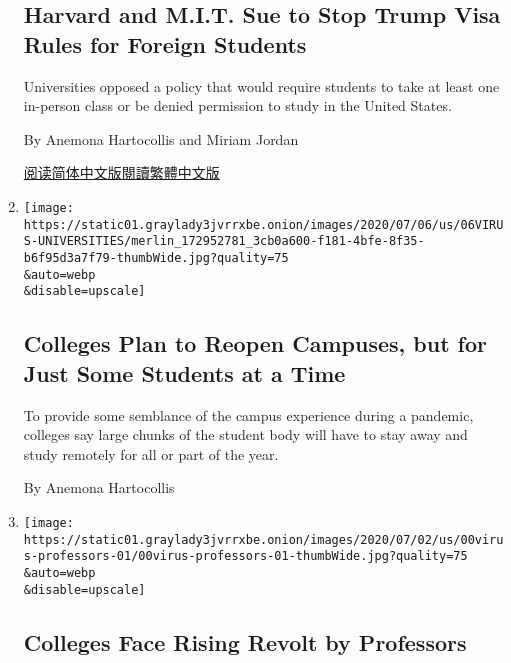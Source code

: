 \begin{enumerate}
{  \subsection{Harvard and M.I.T. Sue to Stop Trump Visa Rules for
  Foreign
  Students}\label{harvard-and-mit-sue-to-stop-trump-visa-rules-for-foreign-students}}

  Universities opposed a policy that would require students to take at
  least one in-person class or be denied permission to study in the
  United States.

  By Anemona Hartocollis and Miriam Jordan

  \href{https://cn.nytimes3xbfgragh.onion/usa/20200709/harvard-mit-trump-ice-students/}{阅读简体中文版}\href{https://cn.nytimes3xbfgragh.onion/usa/20200709/harvard-mit-trump-ice-students/zh-hant/}{閱讀繁體中文版}
\item
  \href{/2020/07/06/us/coronavirus-universities-colleges-reopening.html}{}

  \texttt{[image: https://static01.graylady3jvrrxbe.onion/images/2020/07/06/us/06VIRUS-UNIVERSITIES/merlin\_172952781\_3cb0a600-f181-4bfe-8f35-b6f95d3a7f79-thumbWide.jpg?quality=75\\\&auto=webp\\\&disable=upscale]}

  \hypertarget{colleges-plan-to-reopen-campuses-but-for-just-some-students-at-a-time}{%
  \subsection{Colleges Plan to Reopen Campuses, but for Just Some
  Students at a
  Time}\label{colleges-plan-to-reopen-campuses-but-for-just-some-students-at-a-time}}

  To provide some semblance of the campus experience during a pandemic,
  colleges say large chunks of the student body will have to stay away
  and study remotely for all or part of the year.

  By Anemona Hartocollis
\item
  \href{/2020/07/03/us/coronavirus-college-professors.html}{}

  \texttt{[image: https://static01.graylady3jvrrxbe.onion/images/2020/07/02/us/00virus-professors-01/00virus-professors-01-thumbWide.jpg?quality=75\\\&auto=webp\\\&disable=upscale]}

  \hypertarget{colleges-face-rising-revolt-by-professors}{%
  \subsection{Colleges Face Rising Revolt by
  Professors}\label{colleges-face-rising-revolt-by-professors}}


\end{enumerate}
